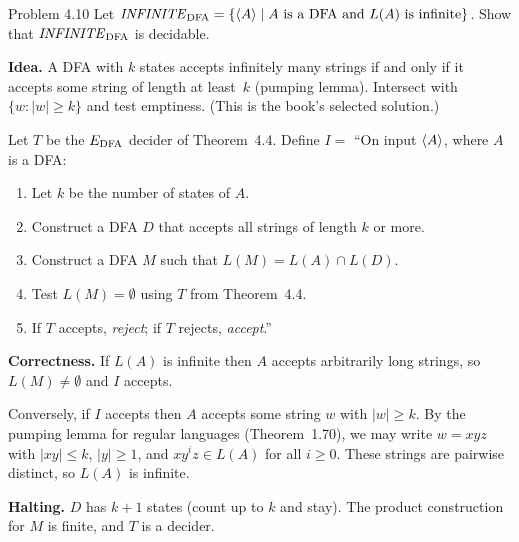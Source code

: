 \begin{question}{Problem 4.10}
Let $\mathit{INFINITE}_{\mathrm{DFA}}=\{\langle A\rangle\mid A\text{ is a DFA and }L(A)\text{ is infinite}\}$.
Show that $\mathit{INFINITE}_{\mathrm{DFA}}$ is decidable.
\end{question}
\begin{soln}
\textbf{Idea.} A DFA with $k$ states accepts infinitely many strings if and only if it accepts some string of length at least~$k$ (pumping lemma). Intersect with $\{w:|w|\ge k\}$ and test emptiness. (This is the book's selected solution.)

Let $T$ be the $E_{\mathrm{DFA}}$ decider of Theorem~4.4. Define
$I=$ ``On input $\langle A\rangle$, where $A$ is a DFA:
\begin{enumerate}
\item Let $k$ be the number of states of $A$.
\item Construct a DFA $D$ that accepts all strings of length $k$ or more.
\item Construct a DFA $M$ such that $L(M)=L(A)\cap L(D)$.
\item Test $L(M)=\emptyset$ using $T$ from Theorem~4.4.
\item If $T$ accepts, \emph{reject}; if $T$ rejects, \emph{accept}.''
\end{enumerate}

\textbf{Correctness.} If $L(A)$ is infinite then $A$ accepts arbitrarily long strings, so $L(M)\ne\emptyset$ and $I$ accepts.

Conversely, if $I$ accepts then $A$ accepts some string $w$ with $|w|\ge k$. By the pumping lemma for regular languages (Theorem~1.70), we may write $w=xyz$ with $|xy|\le k$, $|y|\ge 1$, and $xy^iz\in L(A)$ for all $i\ge 0$. These strings are pairwise distinct, so $L(A)$ is infinite.

\textbf{Halting.} $D$ has $k+1$ states (count up to $k$ and stay). The product construction for $M$ is finite, and $T$ is a decider.
\end{soln}

